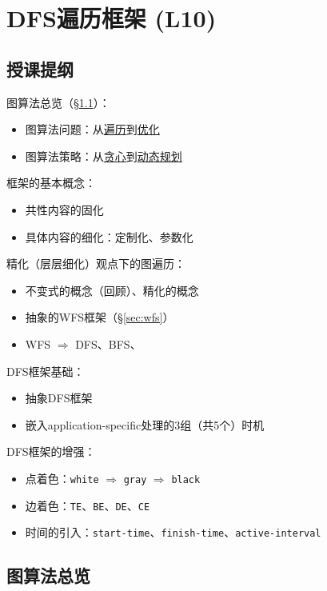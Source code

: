 \chapter{DFS遍历框架 (L10)}


\section*{授课提纲}

\nid 图算法总览（\S\ref{sec:graph-overview}）：
\begin{itemize}
    \item 图算法问题：从\ul{遍历}到\ul{优化}
    \item 图算法策略：从\ul{贪心}到\ul{动态规划}
\end{itemize}

\nid 框架的基本概念：
\begin{itemize}
    \item 共性内容的固化
    \item 具体内容的细化：定制化、参数化
\end{itemize}


\nid 精化（层层细化）观点下的图遍历：
\begin{itemize}
    \item 不变式的概念（回顾）、精化的概念
    \item 抽象的WFS框架（\S \ref{sec:wfs}）
    \item WFS $\Rightarrow$ DFS、BFS、
\end{itemize}


\nid DFS框架基础：
\begin{itemize}
    \item 抽象DFS框架
    \item 嵌入application-specific处理的3组（共5个）时机
\end{itemize}

\nid DFS框架的增强：
\begin{itemize}
    \item 点着色：\texttt{white} $\Rightarrow$ \texttt{gray} $\Rightarrow$ \texttt{black}
    \item 边着色：\texttt{TE}、\texttt{BE}、\texttt{DE}、\texttt{CE}
    \item 时间的引入：\texttt{start-time}、\texttt{finish-time}、\texttt{active-interval}
\end{itemize}

\section{图算法总览} \label{sec:graph-overview}

